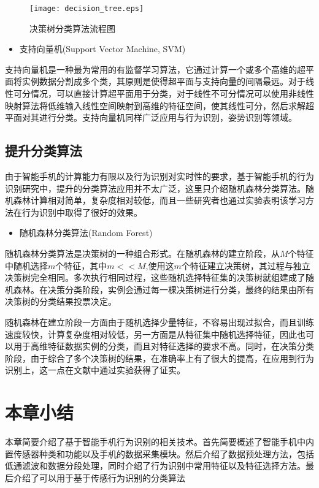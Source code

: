 \begin{figure}[!htb]
\centering
\texttt{[image: decision\_tree.eps]}
\caption{决策树分类算法流程图} \label{decision_tree}
\end{figure}
\begin{itemize}
	\item 支持向量机(Support Vector Machine, SVM)
\end{itemize}
\par 支持向量机是一种最为常用的有监督学习算法，它通过计算一个或多个高维的超平面将实例数据分割成多个类，其原则是使得超平面与支持向量的间隔最远。对于线性可分情况，可以直接计算超平面用于分类，对于线性不可分情况可以使用非线性映射算法将低维输入线性空间映射到高维的特征空间，使其线性可分，然后求解超平面对其进行分类。支持向量机同样广泛应用与行为识别，姿势识别等领域。

\subsection{提升分类算法}
\par 由于智能手机的计算能力有限以及行为识别对实时性的要求，基于智能手机的行为识别研究中，提升的分类算法应用并不太广泛，这里只介绍随机森林分类算法。随机森林计算相对简单，复杂度相对较低，而且一些研究者也通过实验表明该学习方法在行为识别中取得了很好的效果。
\begin{itemize}
	\item 随机森林分类算法(Random Forest)
\end{itemize}
\par 随机森林分类算法是决策树的一种组合形式。在随机森林的建立阶段，从$M$个特征中随机选择$m$个特征，其中$m<<M$,使用这$m$个特征建立决策树，其过程与独立决策树完全相同。多次执行相同过程，这些随机选择特征集的决策树就组建成了随机森林。在决策分类阶段，实例会通过每一棵决策树进行分类，最终的结果由所有决策树的分类结果投票决定。
\par 随机森林在建立阶段一方面由于随机选择少量特征，不容易出现过拟合，而且训练速度较快，计算复杂度相对较低，另一方面是从特征集中随机选择特征，因此也可以用于高维特征数据实例的分类，而且对特征选择的要求不高。同时，在决策分类阶段，由于综合了多个决策树的结果，在准确率上有了很大的提高，在应用到行为识别上，这一点在文献中通过实验获得了证实。

\section{本章小结}
\par 本章简要介绍了基于智能手机行为识别的相关技术。首先简要概述了智能手机中内置传感器种类和功能以及手机的数据采集模块。然后介绍了数据预处理方法，包括低通滤波和数据分段处理，同时介绍了行为识别中常用特征以及特征选择方法。最后介绍了可以用于基于传感行为识别的分类算法